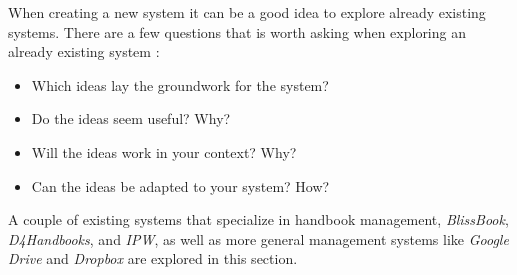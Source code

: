 When creating a new system it can be a good idea to explore already existing systems.
There are a few questions that is worth asking when exploring an already existing system \citep[p.~33]{Rod-Aalborg}:

\begin{itemize}
  \item Which ideas lay the groundwork for the system?
  \item Do the ideas seem useful? Why?
  \item Will the ideas work in your context? Why?
  \item Can the ideas be adapted to your system? How?
\end{itemize}  

A couple of existing systems that specialize in handbook management, \textit{BlissBook}, \textit{D4Handbooks}, and \textit{IPW}, as well as more general management systems like \textit{Google Drive} and \textit{Dropbox} are explored in this section.
